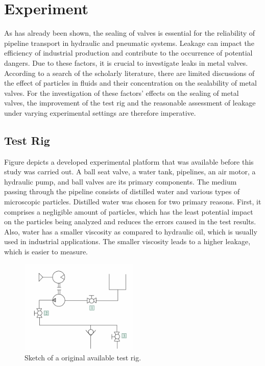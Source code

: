 \chapter{Experiment}
\label{ch:Experiment}
As has already been shown, the sealing of valves is essential for the reliability of 
pipeline transport in hydraulic and pneumatic systems. Leakage can impact the efficiency
 of industrial production and contribute to the occurrence of potential dangers. 
Due to these factors, it is crucial to investigate leaks in metal valves. According to a search 
of the scholarly literature, there are limited discussions of the effect of particles in fluids 
and their concentration on the sealability of metal valves. For the investigation of these 
factors' effects on the sealing of metal valves, the improvement of the test rig and the 
reasonable assessment of leakage under varying experimental settings are therefore imperative.

\section{Test Rig}
\label{Test Rig}
Figure  depicts a developed experimental platform that was available before this study 
was carried out. A ball seat valve, a water tank, pipelines, an air motor, a hydraulic pump,
and ball valves are its primary components. The medium passing through the pipeline 
consists of distilled water and various types of microscopic particles. Distilled water
was chosen for two primary reasons. First, it comprises a negligible amount of particles,
which has the least potential impact on the particles being analyzed and reduces the 
errors caused in the test results. Also, water has a smaller viscosity as compared to
hydraulic oil, which is usually used in industrial applications. 
The smaller viscosity leads to a higher leakage, which is easier to measure. \cite{fischer2021influence}\\

\begin{figure}[htbp]
    \centering
    \includegraphics[width=0.5\textwidth]{figures/TestRig/TestRig1.jpg}
    \caption{Sketch of a original available test rig.}
    \label{fig:TestRig1}
\end{figure}

